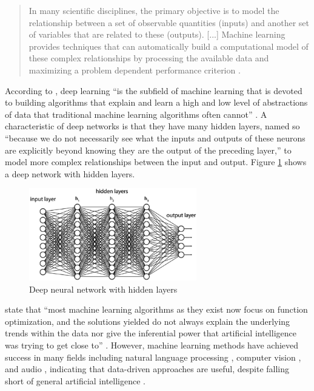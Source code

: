 \documentclass[report.tex]{subfiles}
\begin{document}
\begin{quote}
	In many scientific disciplines, the primary objective is to model the relationship between a set of observable quantities (inputs) and another set of variables that are related to these (outputs). [...] Machine learning provides techniques that can automatically build a computational model of these complex relationships by processing the available data and maximizing a problem dependent performance criterion \parencite[105]{introtoml}.
\end{quote}

According to \citeauthor{introtodl}, deep learning ``is the subfield of machine learning that is devoted to building algorithms that explain and learn a high and low level of abstractions of data that traditional machine learning algorithms often cannot'' \parencite[1]{introtodl}. A characteristic of deep networks is that they have many hidden layers, named so ``because we do not necessarily see what the inputs and outputs of these neurons are explicitly beyond knowing they are the output of the preceding layer,'' \parencite[2]{introtodl} to model more complex relationships between the input and output. Figure \ref{fig:fcdn} shows a deep network with hidden layers.

\begin{figure}[ht]
	\centering
	\includegraphics[width=0.65\textwidth]{./images-neural/dnn.png}
	\caption{Deep neural network with hidden layers \parencite[2]{introtodl}}
	\label{fig:fcdn}
\end{figure}

\citeauthor{introtodl} state that ``most machine learning algorithms as they exist now focus on function optimization, and the solutions yielded do not always explain the underlying trends within the data nor give the inferential power that artificial intelligence was trying to get close to'' \parencite[1]{introtodl}. However, machine learning methods have achieved success in many fields including natural language processing \parencite{nlpml}, computer vision \parencite{cvml}, and audio \parencite{audiodeeplearning}, indicating that data-driven approaches are useful, despite falling short of general artificial intelligence \parencite{generalai}.
\end{document}
